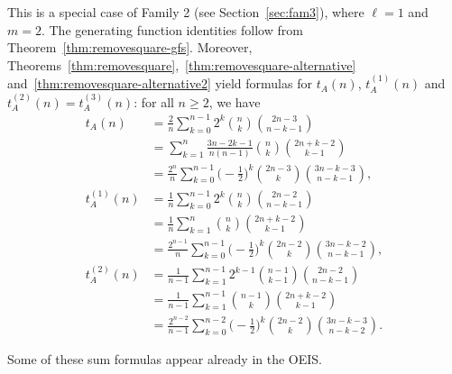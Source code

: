 \documentclass[12pt]{amsart}
\begin{document}
\begin{description}
\begin{itemize}
\end{itemize}
    \item[Discussion] 
This is a special case of Family 2 (see Section~\ref{sec:fam3}), where $\ell = 1$ and $m=2$. The generating function identities follow from Theorem~\ref{thm:removesquare-gfs}. Moreover, Theorems~\ref{thm:removesquare},~\ref{thm:removesquare-alternative} and~\ref{thm:removesquare-alternative2} yield formulas for $t_A(n)$, $t_A^{(1)}(n)$ and
$t_A^{(2)}(n) = t_A^{(3)}(n)$: for all $n \geq 2$, we have
\begin{align*}
  t_{A}(n) &= \frac{2}{n} \sum_{k=0}^{n-1} 2^k  \binom{n}{k} \binom{2n-3}{n-k-1} \\
  &= \sum_{k=1}^{n} \frac{3n-2k-1}{n(n-1)} \binom{n}{k} \binom{2n+k-2}{k-1} \\ 
  &= \frac{2^n}{n} \sum_{k=0}^{n-1} \Big({-}\frac12\Big)^k \binom{2n-3}{k} \binom{3n-k-3}{n-k-1}, \\
  t_{A}^{(1)}(n) &= \frac{1}{n} \sum_{k=0}^{n-1} 2^k \binom{n}{k} \binom{2n-2}{n-k-1} \\
  &= \frac{1}{n} \sum_{k=1}^{n} \binom{n}{k} \binom{2n+k-2}{k-1} \\
  &= \frac{2^{n-1}}{n} \sum_{k=0}^{n-1} \Big({-}\frac12\Big)^k \binom{2n-2}{k} \binom{3n-k-2}{n-k-1}, \\
  t_{A}^{(2)}(n) &= \frac{1}{n-1} \sum_{k=1}^{n-1} 2^{k-1} \binom{n-1}{k-1} \binom{2n-2}{n-k-1}  \\
  &= \frac{1}{n-1} \sum_{k=1}^{n-1} \binom{n-1}{k} \binom{2n+k-2}{k-1} \\
  &= \frac{2^{n-2}}{n-1} \sum_{k=0}^{n-2} \Big({-}\frac12\Big)^k \binom{2n-2}{k} \binom{3n-k-3}{n-k-2}.
\end{align*}

Some of these sum formulas appear already in the OEIS.


\end{description}
\end{document}
